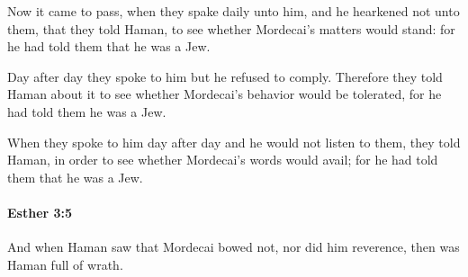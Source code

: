 			\begin{versebox}
					\item[BHS] 
					\item[LXX] 
					\item[ASV] Now it came to pass, when they spake daily unto him, and he hearkened not unto them, that they told Haman, to see whether Mordecai's matters would stand: for he had told them that he was a Jew.
					\item[NIV] Day after day they spoke to him but he refused to comply. Therefore they told Haman about it to see whether Mordecai’s behavior would be tolerated, for he had told them he was a Jew.
					\item[NRSV] When they spoke to him day after day and he would not listen to them, they told Haman, in order to see whether Mordecai’s words would avail; for he had told them that he was a Jew.
			\end{versebox}

		\paragraph{Esther 3:5} %
			\label{ESTHER-3-5}

			And when Haman saw that Mordecai bowed not, nor did him reverence, then was Haman full of wrath.

